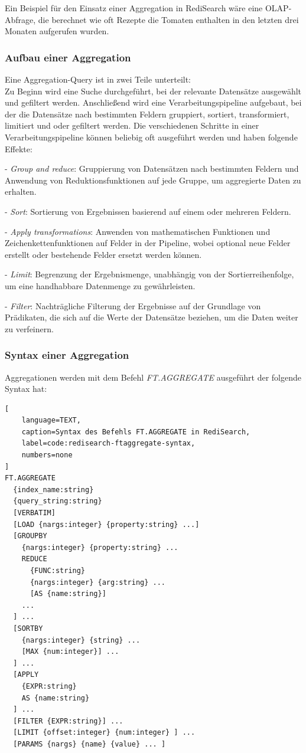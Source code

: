 Ein Beispiel für den Einsatz einer Aggregation in RediSearch wäre eine OLAP-Abfrage, die berechnet wie oft Rezepte die Tomaten enthalten in den letzten drei Monaten aufgerufen wurden.

\subsubsection{Aufbau einer Aggregation}
Eine Aggregation-Query ist in zwei Teile unterteilt:\\
Zu Beginn wird eine Suche durchgeführt, bei der relevante Datensätze ausgewählt und gefiltert werden.
Anschließend wird eine Verarbeitungspipeline aufgebaut, bei der die Datensätze nach bestimmten Feldern gruppiert, sortiert, transformiert, limitiert und oder gefiltert werden. Die verschiedenen Schritte in einer Verarbeitungspipeline können beliebig oft ausgeführt werden und haben folgende Effekte:

- \emph{Group and reduce}: Gruppierung von Datensätzen nach bestimmten Feldern und Anwendung von Reduktionsfunktionen auf jede Gruppe, um aggregierte Daten zu erhalten.
    
- \emph{Sort}: Sortierung von Ergebnissen basierend auf einem oder mehreren Feldern.
    
- \emph{Apply transformations}: Anwenden von mathematischen Funktionen und Zeichenkettenfunktionen auf Felder in der Pipeline, wobei optional neue Felder erstellt oder bestehende Felder ersetzt werden können.
    
- \emph{Limit}: Begrenzung der Ergebnismenge, unabhängig von der Sortierreihenfolge, um eine handhabbare Datenmenge zu gewährleisten.
    
- \emph{Filter}: Nachträgliche Filterung der Ergebnisse auf der Grundlage von Prädikaten, die sich auf die Werte der Datensätze beziehen, um die Daten weiter zu verfeinern.

\subsubsection{Syntax einer Aggregation}\label{sec:redisearch-aggregation-syntax}
Aggregationen werden mit dem Befehl \emph{FT.AGGREGATE} ausgeführt der folgende Syntax hat:
\begin{lstlisting}[
    language=TEXT,
    caption=Syntax des Befehls FT.AGGREGATE in RediSearch,
    label=code:redisearch-ftaggregate-syntax,
    numbers=none
]
FT.AGGREGATE
  {index_name:string}
  {query_string:string}
  [VERBATIM]
  [LOAD {nargs:integer} {property:string} ...]
  [GROUPBY
    {nargs:integer} {property:string} ...
    REDUCE
      {FUNC:string}
      {nargs:integer} {arg:string} ...
      [AS {name:string}]
    ...
  ] ...
  [SORTBY
    {nargs:integer} {string} ...
    [MAX {num:integer}] ...
  ] ...
  [APPLY
    {EXPR:string}
    AS {name:string}
  ] ...
  [FILTER {EXPR:string}] ...
  [LIMIT {offset:integer} {num:integer} ] ...
  [PARAMS {nargs} {name} {value} ... ]
\end{lstlisting}

